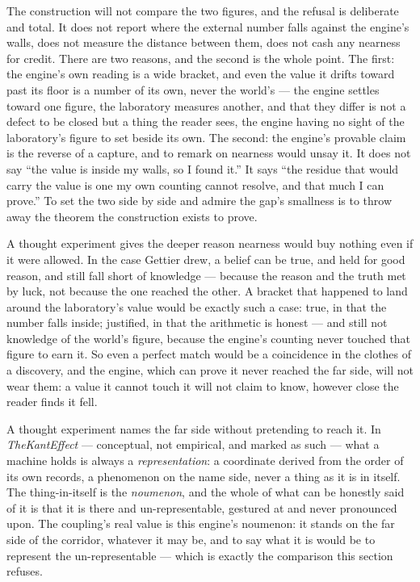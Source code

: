 The construction will not compare the two figures, and the refusal is deliberate and total.
It does not report where the external number falls against the engine's walls, does not measure the distance between
them, does not cash any nearness for credit.
There are two reasons, and the second is the whole point.
The first: the engine's own reading is a wide bracket, and even the value it drifts toward past its floor is a number
of its own, never the world's --- the engine settles toward one figure, the laboratory measures another, and that they
differ is not a defect to be closed but a thing the reader sees, the engine having no sight of the laboratory's figure to
set beside its own.
The second: the engine's provable claim is the reverse of a capture, and to remark on nearness would unsay it.
It does not say ``the value is inside my walls, so I found it.''
It says ``the residue that would carry the value is one my own counting cannot resolve, and that much I can prove.''
To set the two side by side and admire the gap's smallness is to throw away the theorem the construction exists to prove.

A thought experiment gives the deeper reason nearness would buy nothing even if it were allowed.
In the case Gettier drew, a belief can be true, and held for good reason, and still fall short of knowledge --- because
the reason and the truth met by luck, not because the one reached the other.
A bracket that happened to land around the laboratory's value would be exactly such a case: true, in that the number
falls inside; justified, in that the arithmetic is honest --- and still not knowledge of the world's figure, because the
engine's counting never touched that figure to earn it.
So even a perfect match would be a coincidence in the clothes of a discovery, and the engine, which can prove it never
reached the far side, will not wear them: a value it cannot touch it will not claim to know, however close the reader
finds it fell.

A thought experiment names the far side without pretending to reach it.
In \emph{TheKantEffect} --- conceptual, not empirical, and marked as such --- what a machine holds is always a
\emph{representation}: a coordinate derived from the order of its own records, a phenomenon on the name side, never a
thing as it is in itself.
The thing-in-itself is the \emph{noumenon}, and the whole of what can be honestly said of it is that it is there and
un-representable, gestured at and never pronounced upon.
The coupling's real value is this engine's noumenon: it stands on the far side of the corridor, whatever it may be, and to
say what it is would be to represent the un-representable --- which is exactly the comparison this section refuses.

